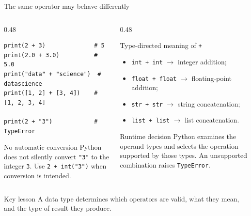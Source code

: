\documentclass[aspectratio=169]{beamer}
\begin{document}
\begin{frame}[fragile]{The same operator may behave differently}
  \footnotesize
  \begin{columns}[T]
    \begin{column}{0.48\textwidth}
\begin{lstlisting}[basicstyle=\ttfamily\scriptsize]
print(2 + 3)              # 5
print(2.0 + 3.0)          # 5.0
print("data" + "science")  # datascience
print([1, 2] + [3, 4])    # [1, 2, 3, 4]

print(2 + "3")            # TypeError
\end{lstlisting}

      \begin{alertblock}{No automatic conversion}
        Python does not silently convert \texttt{"3"} to the integer
        \texttt{3}. Use \texttt{2 + int("3")} when conversion is intended.
      \end{alertblock}
    \end{column}
    \begin{column}{0.48\textwidth}
      \begin{block}{Type-directed meaning of \texttt{+}}
        \begin{itemize}
          \item \texttt{int + int} $\rightarrow$ integer addition;
          \item \texttt{float + float} $\rightarrow$ floating-point addition;
          \item \texttt{str + str} $\rightarrow$ string concatenation;
          \item \texttt{list + list} $\rightarrow$ list concatenation.
        \end{itemize}
      \end{block}

      \begin{exampleblock}{Runtime decision}
        Python examines the operand types and selects the operation supported
        by those types. An unsupported combination raises \texttt{TypeError}.
      \end{exampleblock}
    \end{column}
  \end{columns}

  \vspace{0.2em}
  \begin{alertblock}{Key lesson}
    A data type determines which operators are valid, what they mean, and the
    type of result they produce.
  \end{alertblock}
\end{frame}
\end{document}
